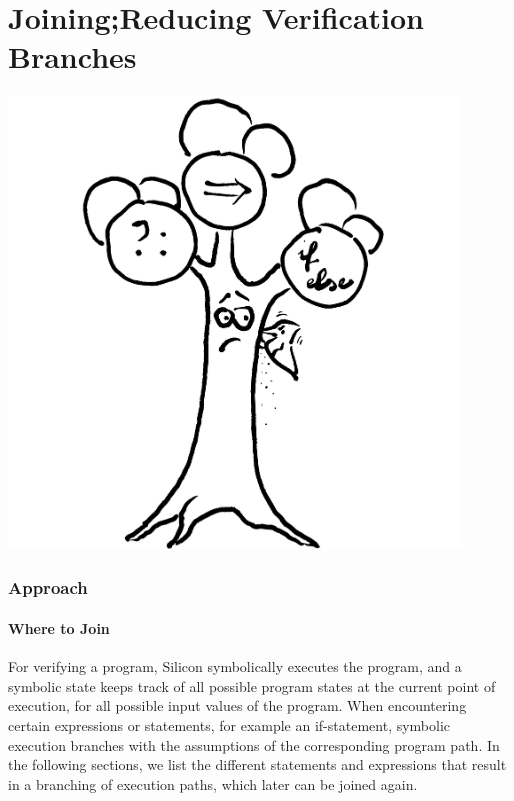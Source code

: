 \documentclass[11pt]{article}
\begin{document}
    \part{Joining;\newline Reducing Verification Branches} \label{part-2}
    \begin{center}
        \vspace{2cm}
        \includegraphics[width=0.9\textwidth]{tree}
    \end{center}

    \newpage
    \section{Approach} \label{p2-approach}

    \subsection{Where to Join} \label{where-to-join}

    For verifying a program, Silicon symbolically executes the program,
    and a symbolic state keeps track of all possible program states at the current point of execution, for all
    possible input values of the program. When encountering certain expressions or statements, for example an
    if-statement, symbolic execution branches with the assumptions of the corresponding program path.
    In the following sections, we list the different statements and expressions 
    that result in a branching of execution paths, which later can be joined again.
    
\end{document}
